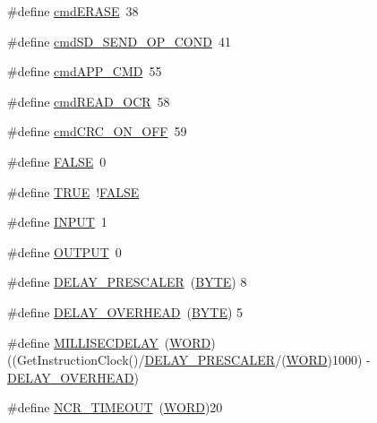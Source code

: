 \begin{DoxyCompactItemize}
\#define \hyperlink{_s_d-_s_p_i_8h_a55e232e684a6de207665213bcc67e424}{cmd\+E\+R\+A\+S\+E}~38
\item 
\#define \hyperlink{_s_d-_s_p_i_8h_a1823d137ba816c2789769b7237e92aa8}{cmd\+S\+D\+\_\+\+S\+E\+N\+D\+\_\+\+O\+P\+\_\+\+C\+O\+N\+D}~41
\item 
\#define \hyperlink{_s_d-_s_p_i_8h_a32a5729b94f9ac752c06ae1f6dfcefcd}{cmd\+A\+P\+P\+\_\+\+C\+M\+D}~55
\item 
\#define \hyperlink{_s_d-_s_p_i_8h_a0ebbbf357fbcdd931f01c7bc66c44613}{cmd\+R\+E\+A\+D\+\_\+\+O\+C\+R}~58
\item 
\#define \hyperlink{_s_d-_s_p_i_8h_adf8889d02075afb8d9a115538ed85846}{cmd\+C\+R\+C\+\_\+\+O\+N\+\_\+\+O\+F\+F}~59
\item 
\#define \hyperlink{_s_d-_s_p_i_8h_aa93f0eb578d23995850d61f7d61c55c1}{F\+A\+L\+S\+E}~0
\item 
\#define \hyperlink{_s_d-_s_p_i_8h_aa8cecfc5c5c054d2875c03e77b7be15d}{T\+R\+U\+E}~!\hyperlink{_generic_type_defs_8h_afbf708854fe02af8475a9ba02f3196cbaa1e095cc966dbecf6a0d8aad75348d1a}{F\+A\+L\+S\+E}
\item 
\#define \hyperlink{_s_d-_s_p_i_8h_a1bb283bd7893b9855e2f23013891fc82}{I\+N\+P\+U\+T}~1
\item 
\#define \hyperlink{_s_d-_s_p_i_8h_a61a3c9a18380aafb6e430e79bf596557}{O\+U\+T\+P\+U\+T}~0
\item 
\#define \hyperlink{_s_d-_s_p_i_8h_a99bf5f9f3c17ec3ba4c8495061430abb}{D\+E\+L\+A\+Y\+\_\+\+P\+R\+E\+S\+C\+A\+L\+E\+R}~(\hyperlink{_generic_type_defs_8h_a4ae1dab0fb4b072a66584546209e7d58}{B\+Y\+T\+E})      8
\item 
\#define \hyperlink{_s_d-_s_p_i_8h_a9473bcfd86d1a015ef7c3bc662b52845}{D\+E\+L\+A\+Y\+\_\+\+O\+V\+E\+R\+H\+E\+A\+D}~(\hyperlink{_generic_type_defs_8h_a4ae1dab0fb4b072a66584546209e7d58}{B\+Y\+T\+E})      5
\item 
\#define \hyperlink{_s_d-_s_p_i_8h_a10000e7943c2d9ec8c4a8daeeb7a1207}{M\+I\+L\+L\+I\+S\+E\+C\+D\+E\+L\+A\+Y}~(\hyperlink{_generic_type_defs_8h_a2b0e863dadf920709ec53d9088ee7c91}{W\+O\+R\+D})      ((Get\+Instruction\+Clock()/\hyperlink{_s_d-_s_p_i_8h_a99bf5f9f3c17ec3ba4c8495061430abb}{D\+E\+L\+A\+Y\+\_\+\+P\+R\+E\+S\+C\+A\+L\+E\+R}/(\hyperlink{_generic_type_defs_8h_a2b0e863dadf920709ec53d9088ee7c91}{W\+O\+R\+D})1000) -\/ \hyperlink{_s_d-_s_p_i_8h_a9473bcfd86d1a015ef7c3bc662b52845}{D\+E\+L\+A\+Y\+\_\+\+O\+V\+E\+R\+H\+E\+A\+D})
\item 
\#define \hyperlink{_s_d-_s_p_i_8h_a2db43dd667b67e072896730162816bcb}{N\+C\+R\+\_\+\+T\+I\+M\+E\+O\+U\+T}~(\hyperlink{_generic_type_defs_8h_a2b0e863dadf920709ec53d9088ee7c91}{W\+O\+R\+D})20

\end{DoxyCompactItemize}
